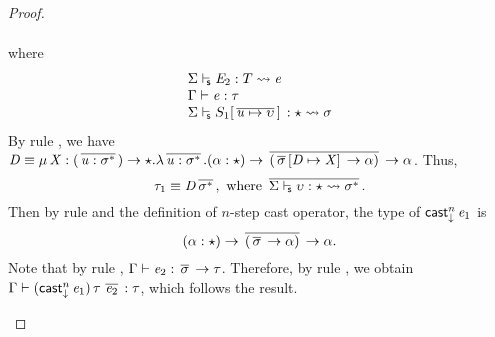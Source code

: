 \begin{proof}
\begin{description}
\begin{align*}
            \end{align*}
            where
            \[\begin{array}{l}
                 \Sigma  \vdash_{\!\!\mathsf{s} }  \mathit{E_{{\mathrm{2}}}}  :  T   \rightsquigarrow   \mathit{e}  \\
                \Gamma  \vdash  \mathit{e}  :  \tau \\
                 \Sigma  \vdash_{\!\!\mathsf{s} }  S_{{\mathrm{1}}}  [  \,\overline{  \mathit{u}  \mapsto  \upsilon  }\,  ] \,  :  \star   \rightsquigarrow   \sigma 
            \end{array}\]
            By rule , we have $\mathit{D}  \equiv  \mu \, \mathit{X}  :  (  \,\overline{  \mathit{u}  :  \sigma  ^{*}  }\,  )  \rightarrow  \star  .  \lambda  \,\overline{  \mathit{u}  :  \sigma  ^{*}  }\,  .  (  \alpha  :  \star  )  \rightarrow  \,\overline{  (  \,\overline{  \sigma  }\,  [  \mathit{D}  \mapsto  \mathit{X}  ] \,  \rightarrow  \alpha  )  }\,  \rightarrow  \alpha$. Thus,
            \[ \tau_{{\mathrm{1}}}  \equiv  \mathit{D} \,\overline{  \sigma  ^{*}  }\,,\text{ where }\,\overline{   \Sigma  \vdash_{\!\!\mathsf{s} }  \upsilon  :  \star   \rightsquigarrow   \sigma  ^{*}   }\,.\] Then by
            rule  and the definition of $n$-step cast operator, the
            type of $\mathsf{cast}_{\downarrow}^n \, \mathit{e_{{\mathrm{1}}}}$ is \[ (  \alpha  :  \star  )  \rightarrow  \,\overline{  (  \,\overline{  \sigma  }\,  \rightarrow  \alpha  )  }\,  \rightarrow  \alpha.\] Note
            that by rule , $\Gamma  \vdash  \mathit{e_{{\mathrm{2}}}}  :  \,\overline{  \sigma  }\,  \rightarrow  \tau$. Therefore, by rule
            , we obtain $\Gamma  \vdash  (  \mathsf{cast}_{\downarrow}^n \, \mathit{e_{{\mathrm{1}}}}  ) \, \tau \, \,\overline{  \mathit{e_{{\mathrm{2}}}}  }\,  :  \tau$, which follows
            the result.
    \end{description}
\end{proof}

